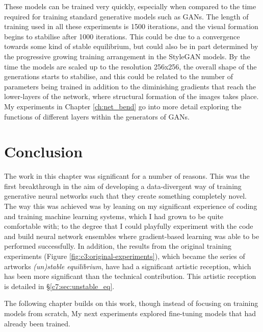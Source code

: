 These models can be trained very quickly, especially when compared to the time required for training standard generative models such as GANs.
The length of training used in all these experiments is 1500 iterations, and the visual formation begins to stabilise after 1000 iterations.
This could be due to a convergence towards some kind of stable equilibrium, but could also be in part determined by the progressive growing training arrangement in the StyleGAN models. 
By the time the models are scaled up to the resolution 256x256, the overall shape of the generations starts to stabilise, and this could be related to the number of parameters being trained  in addition to the diminishing gradients that reach the lower-layers of the network, where structural formation of the images takes place.
My experiments in Chapter \ref{ch:net_bend} go into more detail exploring the functions of different layers within the generators of GANs. 


\section{Conclusion}

The work in this chapter was significant for a number of reasons. 
This was the first breakthrough in the aim of developing a data-divergent way of training generative neural networks such that they create something completely novel. 
The way this was achieved was by leaning on my significant experience of coding and training machine learning systems, which I had grown to be quite comfortable with; to the degree that I could playfully experiment with the code and build neural network ensembles where gradient-based learning was able to be performed successfully.
In addition, the results from the original training experiments (Figure \ref{fig:c3:original-experiments}), which became the series of artworks \textit{(un)stable equilibrium}, have had a significant artistic reception, which has been more significant than the technical contribution.
This artistic reception is detailed in \S \ref{c7:sec:unstable_eq}.

The following chapter builds on this work, though instead of focusing on training models from scratch, 
My next experiments explored fine-tuning models that had already been trained.
